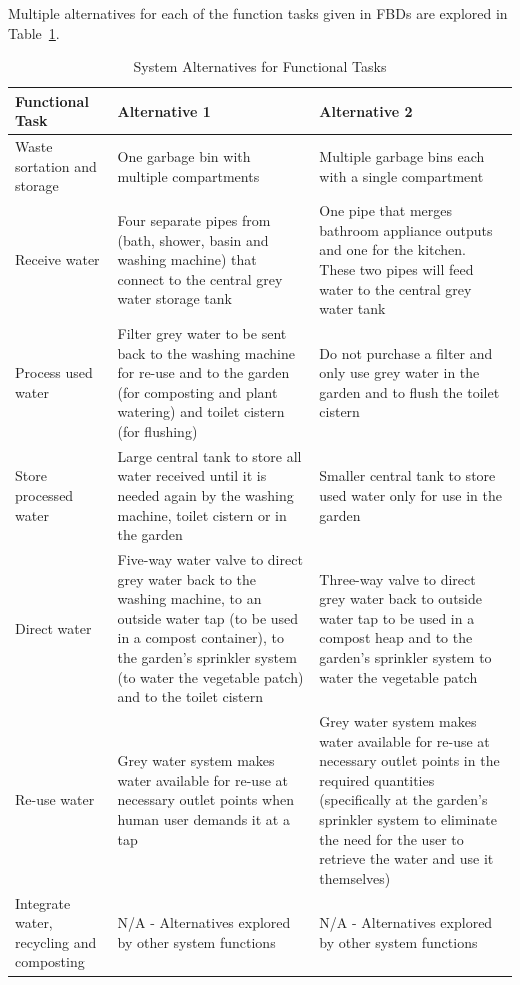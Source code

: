 \documentclass[a4paper,11pt,fleqn]{report}
\begin{document}
Multiple alternatives for each of the function tasks given in \ac{FBD}s are explored in Table~\ref{tb: FunctionalTasks}.
%
\begin{table}[h!]
\caption {System Alternatives for Functional Tasks} \label{tb: FunctionalTasks} 
\begin{center}
\begin{tabular}{p{3.5cm}|p{6cm}|p{6cm}}\toprule
	{\textbf{Functional Task}} & {\textbf{Alternative 1}} & {\textbf{Alternative 2}}\\ \midrule
    Waste sortation and storage & One garbage bin with multiple compartments & Multiple garbage bins each with a single compartment\\
    \hline
    Receive water & Four separate pipes from (bath, shower, basin and washing machine) that connect to the central grey water storage tank & One pipe that merges bathroom appliance outputs and one for the kitchen. These two pipes will feed water to the central grey water tank\\
    \hline
    Process used water & Filter grey water to be sent back to the washing machine for re-use and to the garden (for composting and plant watering) and toilet cistern (for flushing) & Do not purchase a filter and only use grey water in the garden and to flush the toilet cistern\\
    \hline
    Store processed water & Large central tank to store all water received until it is needed again by the washing machine, toilet cistern or in the garden & Smaller central tank to store used water only for use in the garden\\
    \hline
    Direct water & Five-way water valve to direct grey water back to the washing machine, to an outside water tap (to be used in a compost container), to the garden's sprinkler system (to water the vegetable patch) and to the toilet cistern & Three-way valve to direct grey water back to outside water tap to be used in a compost heap and to the garden's sprinkler system to water the vegetable patch\\
    \hline
    Re-use water & Grey water system makes water available for re-use at necessary outlet points when human user demands it at a tap & Grey water system makes water available for re-use at necessary outlet points in the required quantities (specifically at the garden's sprinkler system to eliminate the need for the user to retrieve the water and use it themselves)\\
    \hline
    Integrate water, recycling and composting & N/A - Alternatives explored by other system functions & N/A - Alternatives explored by other system functions\\

\end{tabular}
\end{center}
\end{table}
\end{document}
